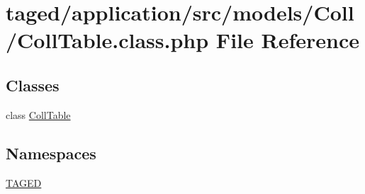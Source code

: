 \hypertarget{_coll_table_8class_8php}{}\section{taged/application/src/models/\+Coll/\+Coll\+Table.class.\+php File Reference}
\label{_coll_table_8class_8php}
\subsection*{Classes}
\begin{DoxyCompactItemize}
\item 
class \hyperlink{class_coll_table}{Coll\+Table}
\end{DoxyCompactItemize}
\subsection*{Namespaces}
\begin{DoxyCompactItemize}
\item 
 \hyperlink{namespace_t_a_g_e_d}{T\+A\+G\+ED}
\end{DoxyCompactItemize}
